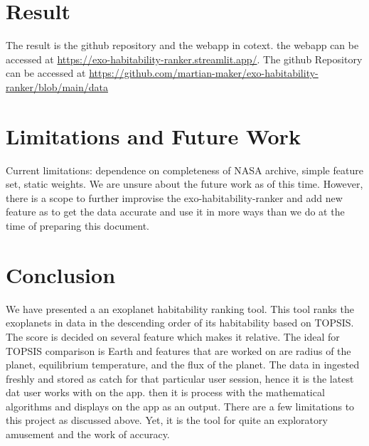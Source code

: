 \documentclass[12pt]{article}
\begin{document}
\section{Result}\label{sec:results}
The result is the github repository and the webapp in cotext. the webapp can be accessed at \hyperlink{https://exo-habitability-ranker.streamlit.app/}{https://exo-habitability-ranker.streamlit.app/}. The github Repository can be accessed at \hyperlink{https://github.com/martian-maker/exo-habitability-ranker/blob/main/data}{https://github.com/martian-maker/exo-habitability-ranker/blob/main/data}

\section{Limitations and Future Work}\label{sec:future}
Current limitations: dependence on completeness of NASA archive, simple feature set, static weights. We are unsure about the future work as of this time. However, there is a scope to further improvise the exo-habitability-ranker and add new feature as to get the data accurate and use it in more ways than we do at the time of preparing this document.  

\section{Conclusion}\label{sec:conclusion}
We have presented a an exoplanet habitability ranking tool. This tool ranks the exoplanets in data in the descending order of its habitability based on TOPSIS. The score is decided on several feature which makes it relative. The ideal for TOPSIS comparison is Earth and features that are worked on are radius of the planet, equilibrium temperature, and the flux of the planet. The data in ingested freshly and stored as catch for that particular user session, hence it is the latest dat user works with on the app. then it is process with the mathematical algorithms and displays on the app as an output. There are a few limitations to this project as discussed above. Yet, it is the tool for quite an exploratory amusement and the work of accuracy.

\newpage
\end{document}
